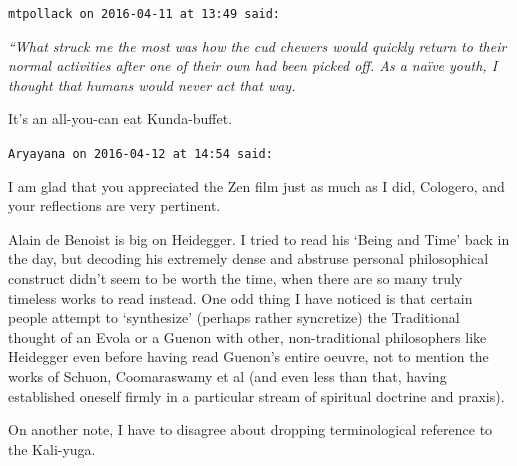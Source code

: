 \begin{footnotesize}
\begin{sffamily}
\texttt{mtpollack on 2016-04-11 at 13:49 said:}

\emph{``What struck me the most was how the cud chewers would quickly return to their normal activities after one of their own had been picked off. As a naïve youth, I thought that humans would never act that way.}

It's an all-you-can eat Kunda-buffet.

\hfill

\texttt{Aryayana on 2016-04-12 at 14:54 said:}

I am glad that you appreciated the Zen film just as much as I did, Cologero, and your reflections are very pertinent.

Alain de Benoist is big on Heidegger. I tried to read his `Being and Time' back in the day, but decoding his extremely dense and abstruse personal philosophical construct didn't seem to be worth the time, when there are so many truly timeless works to read instead. One odd thing I have noticed is that certain people attempt to `synthesize' (perhaps rather syncretize) the Traditional thought of an Evola or a Guenon with other, non-traditional philosophers like Heidegger even before having read Guenon's entire oeuvre, not to mention the works of Schuon, Coomaraswamy et al (and even less than that, having established oneself firmly in a particular stream of spiritual doctrine and praxis).

On another note, I have to disagree about dropping terminological reference to the Kali-yuga.


\end{sffamily}
\end{footnotesize}
